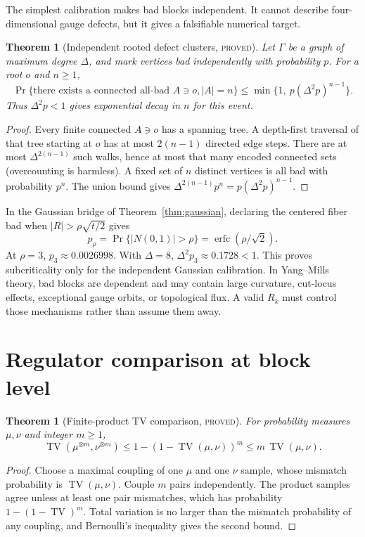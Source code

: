 \documentclass[11pt]{article}
\newcommand{\proved}{\textcolor{provedgreen}{\textsc{proved}}}
\newcommand{\TV}{\operatorname{TV}}
\newtheorem{theorem}[definition]{Theorem}
\theoremstyle{remark}
\begin{document}
The simplest calibration makes bad blocks independent.  It cannot describe
four-dimensional gauge defects, but it gives a falsifiable numerical target.

\begin{theorem}[Independent rooted defect clusters, \proved]
\label{thm:defect}
Let $\Gamma$ be a graph of maximum degree $\Delta$, and mark vertices bad
independently with probability $p$.  For a root $o$ and $n\ge1$,
\[
 \Pr\{\text{there exists a connected all-bad }A\ni o, |A|=n\}
 \le \min\{1,\ p(\Delta^2p)^{n-1}\}.
\]
Thus $\Delta^2p<1$ gives exponential decay in $n$ for this event.
\end{theorem}
\begin{proof}
Every finite connected $A\ni o$ has a spanning tree.  A depth-first traversal
of that tree starting at $o$ has at most $2(n-1)$ directed edge steps.  There
are at most $\Delta^{2(n-1)}$ such walks, hence at most that many encoded
connected sets (overcounting is harmless).  A fixed set of $n$ distinct
vertices is all bad with probability $p^n$.  The union bound gives
$\Delta^{2(n-1)}p^n=p(\Delta^2p)^{n-1}$.
\end{proof}

In the Gaussian bridge of Theorem~\ref{thm:gaussian}, declaring the centered
fiber bad when $|R|>\rho\sqrt{t/2}$ gives
\[
 p_\rho=\Pr\{|N(0,1)|>\rho\}
 =\operatorname{erfc}(\rho/\sqrt2).
\]
At $\rho=3$, $p_3\approx0.0026998$.  With $\Delta=8$,
$\Delta^2p_3\approx0.1728<1$.  This proves subcriticality only for the
independent Gaussian calibration.  In Yang--Mills theory, bad blocks are
dependent and may contain large curvature, cut-locus effects, exceptional gauge
orbits, or topological flux.  A valid $R_k$ must control those mechanisms rather
than assume them away.

\section{Regulator comparison at block level}

\begin{theorem}[Finite-product TV comparison, \proved]
\label{thm:tensor}
For probability measures $\mu,\nu$ and integer $m\ge1$,
\[
 \TV(\mu^{\otimes m},\nu^{\otimes m})
 \le 1-(1-\TV(\mu,\nu))^m
 \le m\,\TV(\mu,\nu).
\]
\end{theorem}
\begin{proof}
Choose a maximal coupling of one $\mu$ and one $\nu$ sample, whose mismatch
probability is $\TV(\mu,\nu)$.  Couple $m$ pairs independently.  The product
samples agree unless at least one pair mismatches, which has probability
$1-(1-\TV)^m$.  Total variation is no larger than the mismatch probability of
any coupling, and Bernoulli's inequality gives the second bound.
\end{proof}
\end{document}

